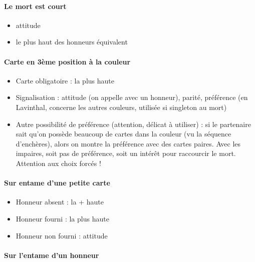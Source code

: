 \documentclass[a4paper]{article}
\begin{document}
\paragraph{Le mort est court}

\begin{itemize}
\item attitude

\item le plus haut des honneurs équivalent

\end{itemize}

\paragraph{Carte en 3ème position à la couleur}

\begin{itemize}
\item Carte obligatoire : la plus haute

\item Signalisation : attitude (on appelle avec un honneur), parité, préférence (en Lavinthal, concerne les autres couleurs, utilisée si singleton au mort)

\item Autre possibilité de préférence (attention, délicat à utiliser) : si le partenaire sait qu’on possède beaucoup de cartes dans la couleur (vu la séquence d’enchères), alors on montre la préférence avec des cartes paires. Avec les impaires, soit pas de préférence, soit un intérêt pour raccourcir le mort. Attention aux choix forcés !

\end{itemize}

\paragraph{Sur entame d’une petite carte}

\begin{itemize}
\item Honneur absent : la + haute

\item Honneur fourni : la plus haute

\item Honneur non fourni : attitude

\end{itemize}

\paragraph{Sur l’entame d’un honneur}
\end{document}
